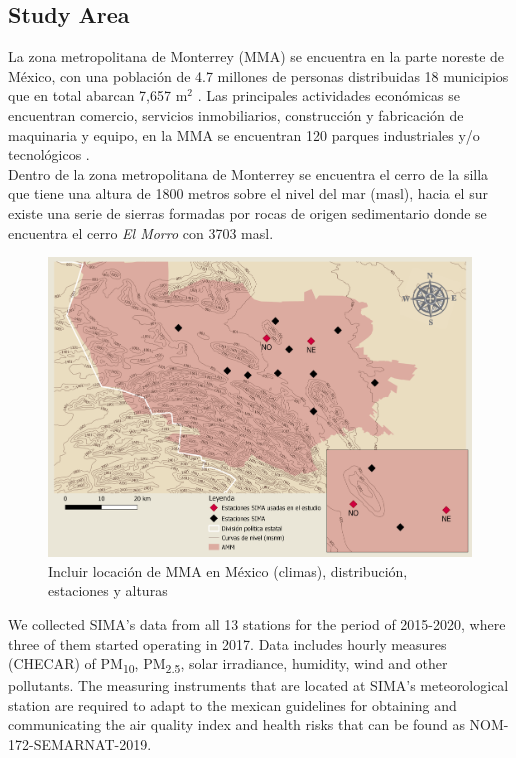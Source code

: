 \subsection{Study Area}
La zona metropolitana de Monterrey (MMA) se encuentra en la parte noreste de México, con una población de 4.7 millones de personas distribuidas 18 municipios que en total abarcan 7,657 m$^2$ \cite{inegi2015}. Las principales actividades económicas se encuentran comercio, servicios inmobiliarios, construcción y fabricación de maquinaria y equipo, en la MMA se encuentran 120 parques industriales y/o tecnológicos \cite{economia2015}.\\
Dentro de la zona metropolitana de Monterrey se encuentra el cerro de la silla que tiene una altura de 1800 metros sobre el nivel del mar (masl), hacia el sur existe una serie de sierras formadas por rocas de origen sedimentario donde se encuentra el cerro \textit{El Morro} con 3703 masl.\cite{inegi2017}
\begin{figure}[H]
    \centering
    \includegraphics[scale=0.15]{images/map.png}
    \caption{Incluir locación de MMA en México (climas), distribución, estaciones y alturas}
    \label{fig:map}
\end{figure}
We collected SIMA’s data from all 13 stations for the period of 2015-2020, where three of them started operating in 2017. Data includes hourly measures (CHECAR) of PM\textsubscript{10}, PM\textsubscript{2.5}, solar irradiance, humidity, wind and other pollutants. The measuring instruments that are located at SIMA’s meteorological station are required to adapt to the mexican guidelines for obtaining and communicating the air quality index and health risks that can be found as NOM-172-SEMARNAT-2019.

